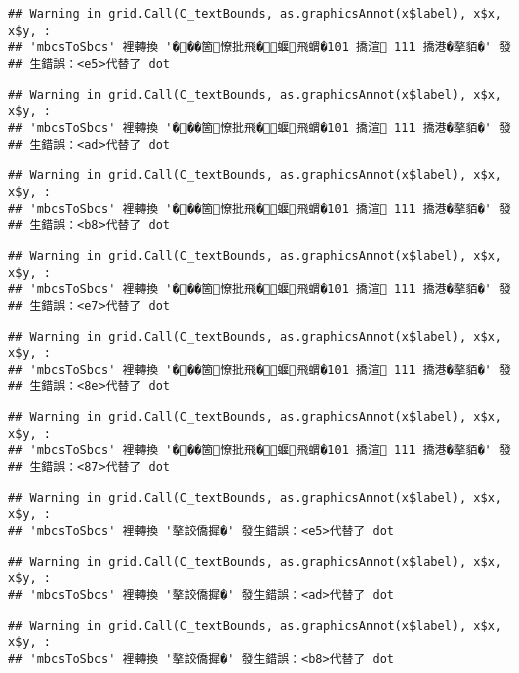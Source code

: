 \documentclass[
]{article}
\begin{document}
\begin{verbatim}
## Warning in grid.Call(C_textBounds, as.graphicsAnnot(x$label), x$x, x$y, :
## 'mbcsToSbcs' 裡轉換 '���箇憭批飛�蝘飛蝟�101 撟渲 111 撟港�摮貊�' 發
## 生錯誤：<e5>代替了 dot
\end{verbatim}

\begin{verbatim}
## Warning in grid.Call(C_textBounds, as.graphicsAnnot(x$label), x$x, x$y, :
## 'mbcsToSbcs' 裡轉換 '���箇憭批飛�蝘飛蝟�101 撟渲 111 撟港�摮貊�' 發
## 生錯誤：<ad>代替了 dot
\end{verbatim}

\begin{verbatim}
## Warning in grid.Call(C_textBounds, as.graphicsAnnot(x$label), x$x, x$y, :
## 'mbcsToSbcs' 裡轉換 '���箇憭批飛�蝘飛蝟�101 撟渲 111 撟港�摮貊�' 發
## 生錯誤：<b8>代替了 dot
\end{verbatim}

\begin{verbatim}
## Warning in grid.Call(C_textBounds, as.graphicsAnnot(x$label), x$x, x$y, :
## 'mbcsToSbcs' 裡轉換 '���箇憭批飛�蝘飛蝟�101 撟渲 111 撟港�摮貊�' 發
## 生錯誤：<e7>代替了 dot
\end{verbatim}

\begin{verbatim}
## Warning in grid.Call(C_textBounds, as.graphicsAnnot(x$label), x$x, x$y, :
## 'mbcsToSbcs' 裡轉換 '���箇憭批飛�蝘飛蝟�101 撟渲 111 撟港�摮貊�' 發
## 生錯誤：<8e>代替了 dot
\end{verbatim}

\begin{verbatim}
## Warning in grid.Call(C_textBounds, as.graphicsAnnot(x$label), x$x, x$y, :
## 'mbcsToSbcs' 裡轉換 '���箇憭批飛�蝘飛蝟�101 撟渲 111 撟港�摮貊�' 發
## 生錯誤：<87>代替了 dot
\end{verbatim}

\begin{verbatim}
## Warning in grid.Call(C_textBounds, as.graphicsAnnot(x$label), x$x, x$y, :
## 'mbcsToSbcs' 裡轉換 '摮詨僑摨�' 發生錯誤：<e5>代替了 dot
\end{verbatim}

\begin{verbatim}
## Warning in grid.Call(C_textBounds, as.graphicsAnnot(x$label), x$x, x$y, :
## 'mbcsToSbcs' 裡轉換 '摮詨僑摨�' 發生錯誤：<ad>代替了 dot
\end{verbatim}

\begin{verbatim}
## Warning in grid.Call(C_textBounds, as.graphicsAnnot(x$label), x$x, x$y, :
## 'mbcsToSbcs' 裡轉換 '摮詨僑摨�' 發生錯誤：<b8>代替了 dot
\end{verbatim}
\end{document}
